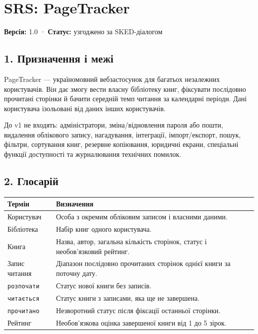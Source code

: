 \documentclass[
]{article}
\author{}
\date{}
\begin{document}
{
\setcounter{tocdepth}{3}
\tableofcontents
}
\hypertarget{srs-pagetracker}{%
\section{SRS: PageTracker}\label{srs-pagetracker}}

\textbf{Версія:} 1.0 · \textbf{Статус:} узгоджено за SKED-діалогом

\hypertarget{1-ux43fux440ux438ux437ux43dux430ux447ux435ux43dux43dux44f-ux456-ux43cux435ux436ux456}{%
\subsection{1. Призначення і
межі}\label{1-ux43fux440ux438ux437ux43dux430ux447ux435ux43dux43dux44f-ux456-ux43cux435ux436ux456}}

PageTracker --- україномовний вебзастосунок для багатьох незалежних
користувачів. Він дає змогу вести власну бібліотеку книг, фіксувати
послідовно прочитані сторінки й бачити середній темп читання за
календарні періоди. Дані користувача ізольовані від даних інших
користувачів.

До v1 не входять: адміністратори, зміна/відновлення пароля або пошти,
видалення облікового запису, нагадування, інтеграції, імпорт/експорт,
пошук, фільтри, сортування книг, резервне копіювання, юридичні екрани,
спеціальні функції доступності та журналювання технічних помилок.

\hypertarget{2-ux433ux43bux43eux441ux430ux440ux456ux439}{%
\subsection{2.
Глосарій}\label{2-ux433ux43bux43eux441ux430ux440ux456ux439}}

\begin{longtable}[]{@{}ll@{}}
\toprule\noalign{}
Термін & Визначення \\
\midrule\noalign{}
\endhead
\bottomrule\noalign{}
\endlastfoot
Користувач & Особа з окремим обліковим записом і власними даними. \\
Бібліотека & Набір книг одного користувача. \\
Книга & Назва, автор, загальна кількість сторінок, статус і
необов'язковий рейтинг. \\
Запис читання & Діапазон послідовно прочитаних сторінок однієї книги за
поточну дату. \\
\texttt{розпочати} & Статус нової книги без записів. \\
\texttt{читається} & Статус книги з записами, яка ще не завершена. \\
\texttt{прочитано} & Незворотний статус після фіксації останньої
сторінки. \\
Рейтинг & Необов'язкова оцінка завершеної книги від 1 до 5 зірок. \\
\end{longtable}
\end{document}
